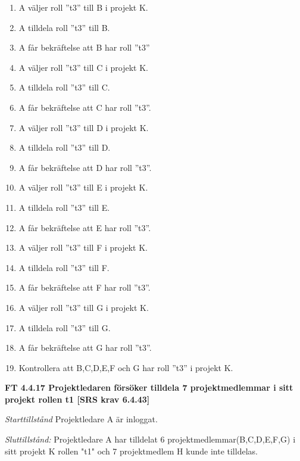 \documentclass[a4paper]{article}
\begin{document}
\begin{enumerate}
\item A väljer roll ”t3” till B i projekt K. 
\item A tilldela roll ”t3” till B. 
\item A får bekräftelse att B har roll ”t3”
\item A väljer roll ”t3” till C i projekt K.
\item A tilldela roll ”t3” till C. 
\item A får bekräftelse att C har roll ”t3”.
\item A väljer roll ”t3” till D i projekt K. 
\item A tilldela roll ”t3” till D. 
\item A får bekräftelse att D har roll ”t3”.
\item A väljer roll ”t3” till E i projekt K. 
\item A tilldela roll ”t3” till E. 
\item A får bekräftelse att E har roll ”t3”.
\item A väljer roll ”t3” till F i projekt K. 
\item A tilldela roll ”t3” till F. 
\item A får bekräftelse att F har roll ”t3”.
\item A väljer roll ”t3” till G i projekt K.
\item A tilldela roll ”t3” till G. 
\item A får bekräftelse att G har roll ”t3”.

\item Kontrollera att B,C,D,E,F och G har roll ”t3” i projekt K.
\end{enumerate}

\textbf{FT 4.4.17 Projektledaren försöker tilldela 7 projektmedlemmar i sitt projekt rollen t1 [SRS krav 6.4.43]}

\emph{Starttillstånd} Projektledare A är inloggat.

\emph{Sluttillstånd:} Projektledare A  har tilldelat 6  projektmedlemmar(B,C,D,E,F,G) i sitt projekt K  rollen "t1" och 7 projektmedlem H kunde inte tilldelas.
\end{document}
